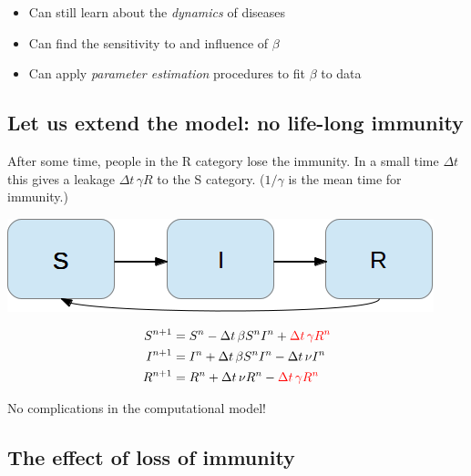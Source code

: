 \documentclass[%
twoside,                 %
final,                   %
10pt]{article}
\newenvironment{block_mdfboxadmon}[1][]{
\begin{block_mdfboxmdframed}[frametitle=#1]
}
{
\end{block_mdfboxmdframed}
}
\begin{document}
\begin{block_mdfboxadmon}
\begin{itemize}
 \item Can still learn about the \emph{dynamics} of diseases

 \item Can find the sensitivity to and influence of $\beta$

 \item Can apply \emph{parameter estimation} procedures to fit $\beta$ to data
\end{itemize}

\noindent
\end{block_mdfboxadmon}



\subsection{Let us extend the model: no life-long immunity}


\begin{block_mdfboxadmon}[Assumption.]
After some time, people in the R category lose the immunity.
In a small time $\Delta t$ this gives a leakage $\Delta t\,\gamma R$
to the S category. ($1/\gamma$ is the mean time for immunity.)
\end{block_mdfboxadmon}




\begin{center}  %
  \centerline{\includegraphics[width=0.7\linewidth]{fig/categories_SIR_feedback.png}}
\end{center}


\begin{align}
S^{n+1} &= S^n - \Delta t\,\beta S^nI^n + \color{red}{\Delta t\,\gamma R^n}
\label{SIR2:S}\\
I^{n+1} &= I^n + \Delta t\,\beta S^nI^n -\Delta t\,\nu I^n
\label{SIR2:I}\\
R^{n+1} &= R^n + \Delta t\,\nu R^n - \color{red}{\Delta t\,\gamma R^n}
\label{SIR2:R}
\end{align}

No complications in the computational model!

\subsection{The effect of loss of immunity}
\end{document}
